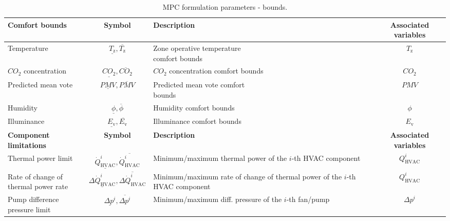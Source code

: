 \documentclass[10pt]{extarticle}
\begin{document}
\renewcommand{\arraystretch}{2}
\begin{table}[h]
	\centering
	\caption{MPC formulation parameters - bounds.}
	\label{tab:mpc_form:parameters:bounds}
		\begin{adjustwidth}{-1.5cm}{}
	\begin{tabular}{l|c|l|c}
		\toprule
		\textbf{Comfort bounds}  & \textbf{Symbol} &  \textbf{Description} & \textbf{Associated variables} \\
		\midrule
		Temperature & $\underline{T_{\text{z}}},\overline{T_{\text{z}}}$ & \makecell[l]{Zone operative temperature  \\ comfort bounds } & $T_{\text{z}}$ \\
		$CO_2$ concentration & $\underline{CO_2},\overline{CO_2}$ & \makecell[l]{$CO_2$ concentration comfort \\ bounds} & $CO_{2}$ \\
		Predicted mean vote & $\underline{PMV},\overline{PMV}$ &  \makecell[l]{Predicted mean vote comfort \\ bounds} & $PMV$ \\
		Humidity & $\underline{\phi},\overline{\phi}$ &  Humidity comfort bounds & $\phi$  \\
		Illuminance & $\underline{E_{\text{v}}},\overline{E_{\text{v}}}$ & Illuminance comfort bounds & $E_{\text{v}}$  \\
		\bottomrule 
		\textbf{Component limitations}  & \textbf{Symbol} &  \textbf{Description} & \textbf{Associated variables} \\
		\midrule
		Thermal power limit & $\underline{\dot{Q}^i_{\text{HVAC}}},\overline{\dot{Q}^i_{\text{HVAC}}}$ & \makecell[l]{Minimum/maximum thermal power of \\ the $i$-th HVAC component} & $Q^i_{\text{HVAC}}$ \\
		\makecell[l]{Rate of change of\\ thermal power rate}  & $\underline{\Delta \dot{Q}^i_{\text{HVAC}}},\overline{\Delta \dot{Q}^i_{\text{HVAC}}}$ & \makecell[l]{Minimum/maximum rate of change of  thermal  \\ power  of the  $i$-th HVAC component} & $Q^i_{\text{HVAC}}$ \\
		\makecell[l]{Pump difference\\ pressure limit}   & $\underline{\Delta p^i},\overline{\Delta p^i}$ & \makecell[l]{Minimum/maximum diff. pressure \\  of the  $i$-th fan/pump} & $\Delta p^i$ \\

\end{tabular}
\end{adjustwidth}
\end{table}
\end{document}
